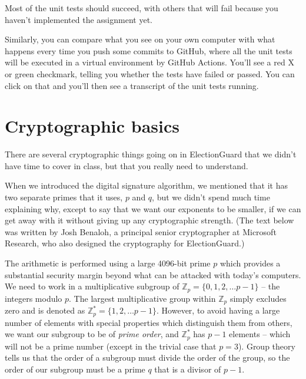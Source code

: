 
Most of the unit tests should succeed, with others that will fail because you haven't
implemented the assignment yet.

Similarly, you can compare what you see on your own computer with
what happens every time you push some commits to GitHub, where all
the unit tests will be executed in a virtual environment
by GitHub Actions. You'll see a red X or green checkmark, telling you
whether the tests have failed or passed. You can click on that
and you'll then see a transcript of the unit tests running.

\section{Cryptographic basics}
There are several cryptographic things going on in ElectionGuard that
we didn't have time to cover in class, but that you really need to
understand.

When we introduced the digital signature algorithm, we mentioned that
it has two separate primes that it uses, $p$ and $q$, but we didn't
spend much time explaining why, except to say that we want our
exponents to be smaller, if we can get away with it without giving up
any cryptographic strength. (The text below was written by 
Josh Benaloh, a principal senior cryptographer at Microsoft Research,
who also designed the cryptography for ElectionGuard.)

The arithmetic is performed using a large 4096-bit prime $p$ which
provides a substantial security margin beyond what can be attacked
with today's computers.  We need to work in a multiplicative subgroup of
$\mathbb{Z}_p=\{0, 1, 2, \ldots p-1\}$ -- the
integers modulo $p$.  The largest multiplicative group within
$\mathbb{Z}_p$ simply excludes zero and is denoted as
$\mathbb{Z}_p^*=\{1, 2, \ldots p-1\}$.  However, to avoid having a
large number of elements with special properties which distinguish
them from others, we want our subgroup to be of {\em prime order}, and
$\mathbb{Z}_p^*$ has $p-1$ elements – which will not be a prime number
(except in the trivial case that $p=3$). Group theory tells us that
the order of a subgroup must divide the order of the group, so the
order of our subgroup must be a prime $q$ that is a divisor of $p-1$.

